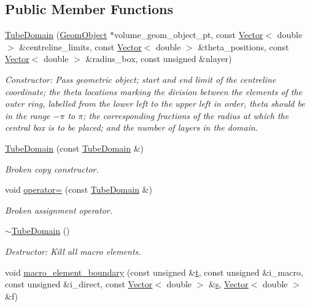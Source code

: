 \subsection*{Public Member Functions}
\begin{DoxyCompactItemize}
\item 
\hyperlink{classoomph_1_1TubeDomain_a025d462a0676026e5902d07ffbb3510e}{Tube\+Domain} (\hyperlink{classoomph_1_1GeomObject}{Geom\+Object} $\ast$volume\+\_\+geom\+\_\+object\+\_\+pt, const \hyperlink{classoomph_1_1Vector}{Vector}$<$ double $>$ \&centreline\+\_\+limits, const \hyperlink{classoomph_1_1Vector}{Vector}$<$ double $>$ \&theta\+\_\+positions, const \hyperlink{classoomph_1_1Vector}{Vector}$<$ double $>$ \&radius\+\_\+box, const unsigned \&nlayer)
\begin{DoxyCompactList}\small\item\em Constructor\+: Pass geometric object; start and end limit of the centreline coordinate; the theta locations marking the division between the elements of the outer ring, labelled from the lower left to the upper left in order, theta should be in the range $-\pi$ to $\pi$; the corresponding fractions of the radius at which the central box is to be placed; and the number of layers in the domain. \end{DoxyCompactList}\item 
\hyperlink{classoomph_1_1TubeDomain_a39d38474ae91e479d615e315445b22c5}{Tube\+Domain} (const \hyperlink{classoomph_1_1TubeDomain}{Tube\+Domain} \&)
\begin{DoxyCompactList}\small\item\em Broken copy constructor. \end{DoxyCompactList}\item 
void \hyperlink{classoomph_1_1TubeDomain_a3731e671028bb0ea3b01e7fe2723cbbc}{operator=} (const \hyperlink{classoomph_1_1TubeDomain}{Tube\+Domain} \&)
\begin{DoxyCompactList}\small\item\em Broken assignment operator. \end{DoxyCompactList}\item 
\hyperlink{classoomph_1_1TubeDomain_ad836e9ab146d2317ed55ee199d54b3e4}{$\sim$\+Tube\+Domain} ()
\begin{DoxyCompactList}\small\item\em Destructor\+: Kill all macro elements. \end{DoxyCompactList}\item 
void \hyperlink{classoomph_1_1TubeDomain_a1f16dde7ad082e2557dff9c737dae6c0}{macro\+\_\+element\+\_\+boundary} (const unsigned \&\hyperlink{cfortran_8h_af6f0bd3dc13317f895c91323c25c2b8f}{t}, const unsigned \&i\+\_\+macro, const unsigned \&i\+\_\+direct, const \hyperlink{classoomph_1_1Vector}{Vector}$<$ double $>$ \&\hyperlink{cfortran_8h_ab7123126e4885ef647dd9c6e3807a21c}{s}, \hyperlink{classoomph_1_1Vector}{Vector}$<$ double $>$ \&f)

\end{DoxyCompactItemize}
